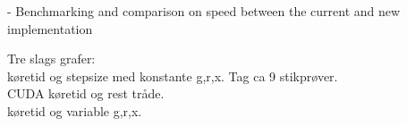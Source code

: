 - Benchmarking and comparison on speed between the current and new implementation

Tre slags grafer: \\
køretid og stepsize med konstante g,r,x. Tag ca 9 stikprøver. \\
CUDA køretid og rest tråde. \\
køretid og variable g,r,x.